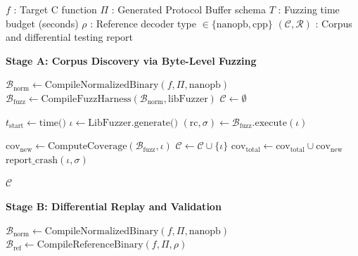 \begin{algorithm}[H]
\caption{Two-Stage Differential Testing Protocol}
\label{alg:differential_testing}
\begin{algorithmic}[1]
\REQUIRE $f$ : Target C function
\REQUIRE $\Pi$ : Generated Protocol Buffer schema
\REQUIRE $T$ : Fuzzing time budget (seconds)
\REQUIRE $\rho$ : Reference decoder type $\in \{\text{nanopb}, \text{cpp}\}$
\ENSURE $(\mathcal{C}, \mathcal{R})$ : Corpus and differential testing report

\STATE \textbf{Stage A: Corpus Discovery via Byte-Level Fuzzing}

    \STATE $\mathcal{B}_{\text{norm}} \leftarrow \text{CompileNormalizedBinary}(f, \Pi, \text{nanopb})$
    \STATE $\mathcal{B}_{\text{fuzz}} \leftarrow \text{CompileFuzzHarness}(\mathcal{B}_{\text{norm}}, \text{libFuzzer})$
    \STATE $\mathcal{C} \leftarrow \emptyset$ 

    \STATE {}
    \STATE $t_{\text{start}} \leftarrow \text{time()}$
        \STATE $\iota \leftarrow \text{LibFuzzer.generate()}$ 
        \STATE $(\text{rc}, \sigma) \leftarrow \mathcal{B}_{\text{fuzz}}.\text{execute}(\iota)$

            \STATE $\text{cov}_{\text{new}} \leftarrow \text{ComputeCoverage}(\mathcal{B}_{\text{fuzz}}, \iota)$
                \STATE $\mathcal{C} \leftarrow \mathcal{C} \cup \{\iota\}$ 
                \STATE $\text{cov}_{\text{total}} \leftarrow \text{cov}_{\text{total}} \cup \text{cov}_{\text{new}}$
            \ENDIF
        \ELSE
            \STATE $\text{report\_crash}(\iota, \sigma)$ 
        \ENDIF
    \ENDWHILE

    \RETURN $\mathcal{C}$
\ENDPROCEDURE

\vspace{0.5cm}

\STATE \textbf{Stage B: Differential Replay and Validation}

    \STATE $\mathcal{B}_{\text{norm}} \leftarrow \text{CompileNormalizedBinary}(f, \Pi, \text{nanopb})$
    \STATE $\mathcal{B}_{\text{ref}} \leftarrow \text{CompileReferenceBinary}(f, \Pi, \rho)$


\end{algorithmic}
\end{algorithm}
